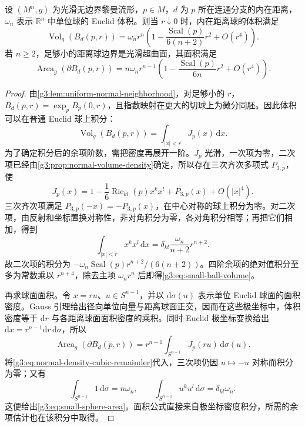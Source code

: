 \begin{theorem}\label{g3:thm:small-ball-volume}
	设 \((M^n,g)\) 为光滑无边界黎曼流形，\(p\in M\)，\(d\) 为 \(p\) 所在连通分支的内在距离，\(\omega_n\) 表示 \(\mathbb R^n\) 中单位球的 Euclid 体积。则当 \(r\downarrow0\) 时，内在距离球的体积满足
	\begin{equation}\label{g3:eq:small-ball-volume}
		\operatorname{Vol}_g(B_d(p,r))
		=\omega_n r^n\left(1-\frac{\operatorname{Scal}(p)}{6(n+2)}r^2+O(r^4)\right).
	\end{equation}
	若 \(n\ge2\)，足够小的距离球边界是光滑超曲面，其面积满足
	\begin{equation}\label{g3:eq:small-sphere-area}
		\operatorname{Area}_g(\partial B_d(p,r))
		=n\omega_n r^{n-1}\left(1-\frac{\operatorname{Scal}(p)}{6n}r^2+O(r^4)\right).
	\end{equation}
\end{theorem}
\begin{proof}
	由\cref{g3:lem:uniform-normal-neighborhood}，对足够小的 \(r\)，\(B_d(p,r)=\exp_p B_p(0,r)\)，且指数映射在更大的切球上为微分同胚。因此体积可以在普通 Euclid 球上积分：
	\[
		\operatorname{Vol}_g(B_d(p,r))=\int_{|x|<r}J_p(x)\,\mathrm dx.
	\]
	为了确定积分后的余项阶数，需把密度再展开一阶。\(J_p\) 光滑，一次项为零，二次项已经由\cref{g3:prop:normal-volume-density}确定，所以存在三次齐次多项式 \(P_{3,p}\)，使
	\begin{equation}\label{g3:eq:normal-density-cubic-remainder}
		J_p(x)=1-\frac16\operatorname{Ric}_{kl}(p)x^kx^l
		+P_{3,p}(x)+O(|x|^4).
	\end{equation}
	三次齐次项满足 \(P_{3,p}(-x)=-P_{3,p}(x)\)，在中心对称的球上积分为零。对二次项，由反射和坐标置换对称性，非对角积分为零，各对角积分相等；再把它们相加，得到
	\[
		\int_{|x|<r}x^kx^l\,\mathrm dx
		=\delta_{kl}\frac{\omega_n}{n+2}r^{n+2}.
	\]
	故二次项的积分为 \(-\omega_n\operatorname{Scal}(p)r^{n+2}/(6(n+2))\)。四阶余项的绝对值积分至多为常数乘以 \(r^{n+4}\)，除去主项 \(\omega_n r^n\) 后即得\eqref{g3:eq:small-ball-volume}。

	再求球面面积。令 \(x=ru\)、\(u\in S^{n-1}\)，并以 \(\mathrm d\sigma(u)\) 表示单位 Euclid 球面的面积密度。Gauss 引理给出径向单位向量与距离球面正交，因而在这些极坐标中，体积密度等于 \(\mathrm dr\) 与各距离球面面积密度的乘积。同时 Euclid 极坐标变换给出 \(\mathrm dx=r^{n-1}\mathrm dr\,\mathrm d\sigma\)，所以
	\[
		\operatorname{Area}_g(\partial B_d(p,r))
		=r^{n-1}\int_{S^{n-1}}J_p(ru)\,\mathrm d\sigma(u).
	\]
	将\eqref{g3:eq:normal-density-cubic-remainder}代入，三次项仍因 \(u\mapsto-u\) 对称而积分为零；又有
	\[
		\int_{S^{n-1}}1\,\mathrm d\sigma=n\omega_n,
		\qquad
		\int_{S^{n-1}}u^ku^l\,\mathrm d\sigma=\delta_{kl}\omega_n.
	\]
	这便给出\eqref{g3:eq:small-sphere-area}。面积公式直接来自极坐标密度积分，所需的余项估计也在该积分中取得。
\end{proof}

